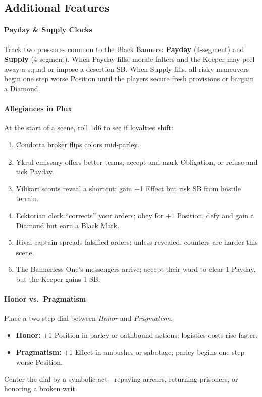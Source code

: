 \subsection*{Additional Features}
\label{sec:black-banners-minor}

\paragraph{Payday \& Supply Clocks}
Track two pressures common to the Black Banners: \textbf{Payday} (4-segment) and \textbf{Supply} (4-segment). When Payday fills, morale falters and the Keeper may peel away a squad or impose a desertion SB. When Supply fills, all risky maneuvers begin one step worse Position until the players secure fresh provisions or bargain a Diamond.

\paragraph{Allegiances in Flux}
At the start of a scene, roll 1d6 to see if loyalties shift:
\begin{enumerate}
  \item Condotta broker flips colors mid-parley.  
  \item Ykrul emissary offers better terms; accept and mark Obligation, or refuse and tick Payday.  
  \item Vilikari scouts reveal a shortcut; gain +1 Effect but risk SB from hostile terrain.  
  \item Ecktorian clerk “corrects” your orders; obey for +1 Position, defy and gain a Diamond but earn a Black Mark.  
  \item Rival captain spreads falsified orders; unless revealed, counters are harder this scene.  
  \item The Bannerless One’s messengers arrive; accept their word to clear 1 Payday, but the Keeper gains 1 SB.  
\end{enumerate}

\paragraph{Honor vs.\ Pragmatism}
Place a two-step dial between \emph{Honor} and \emph{Pragmatism}.  
\begin{itemize}
  \item \textbf{Honor:} +1 Position in parley or oathbound actions; logistics costs rise faster.  
  \item \textbf{Pragmatism:} +1 Effect in ambushes or sabotage; parley begins one step worse Position.  
\end{itemize}
Center the dial by a symbolic act—repaying arrears, returning prisoners, or honoring a broken writ.

